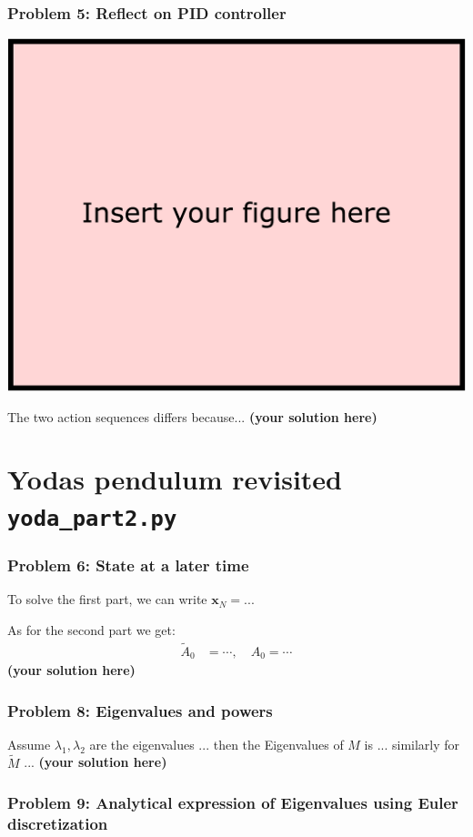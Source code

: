 \documentclass[12pt,twoside]{article}
\newcommand\redt[1]{ {\textcolor[rgb]{0.60, 0.00, 0.00}{\textbf{ #1} } } }
\newcommand{\m}[1]{\boldsymbol{ #1}}
\newcommand{\yoursolution}{ \redt{(your solution here) } }
\begin{document}
\subsubsection*{{\color{red}Problem 5:  Reflect on PID controller}}
			
		\begin{center}\includegraphics[width=.6\linewidth]{figures/your_answer} \end{center}
	The two action sequences differs because... \yoursolution	
	
\section{Yodas pendulum revisited \texttt{yoda\_part2.py} }\label{yoda2}
\subsubsection*{{\color{red}Problem 6:  State at a later time}}
	
		To solve the first part, we can write $\m x_N = ...$ 
		
		As for the second part we get:
\begin{align}
\tilde A_0 & = \cdots, \quad A_0 = \cdots
\end{align}
		\yoursolution 	
\subsubsection*{{\color{red}Problem 8:  Eigenvalues and powers}}
	
Assume $\lambda_1, \lambda_2$ are the eigenvalues ... then the Eigenvalues of $M$ is ... similarly for $\tilde M$ ... 
\yoursolution
	
\subsubsection*{{\color{red}Problem 9:  Analytical expression of Eigenvalues using Euler discretization}}
\end{document}
